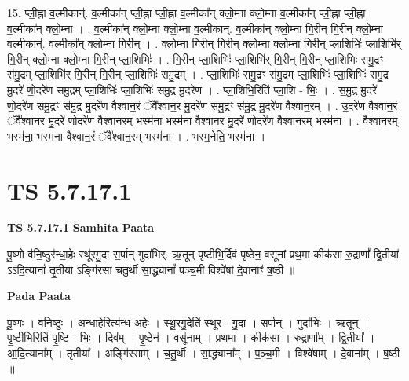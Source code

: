 \documentclass[17pt]{extarticle}
\begin{document}
15. प्ली॒ह्ना व॒ल्मीकान्॑. व॒ल्मीका᳚न् प्ली॒ह्ना प्ली॒ह्ना व॒ल्मीका᳚न् क्लो॒म्ना क्लो॒म्ना व॒ल्मीका᳚न् प्ली॒ह्ना प्ली॒ह्ना व॒ल्मीका᳚न् क्लो॒म्ना । . व॒ल्मीका᳚न् क्लो॒म्ना क्लो॒म्ना व॒ल्मीकान्॑. व॒ल्मीका᳚न् क्लो॒म्ना गि॒रीन् गि॒रीन् क्लो॒म्ना व॒ल्मीकान्॑. व॒ल्मीका᳚न् क्लो॒म्ना गि॒रीन् । . क्लो॒म्ना गि॒रीन् गि॒रीन् क्लो॒म्ना क्लो॒म्ना गि॒रीन् प्ला॒शिभिः॑ प्ला॒शिभि॑र् गि॒रीन् क्लो॒म्ना क्लो॒म्ना गि॒रीन् प्ला॒शिभिः॑ । . गि॒रीन् प्ला॒शिभिः॑ प्ला॒शिभि॑र् गि॒रीन् गि॒रीन् प्ला॒शिभिः॑ समु॒द्रꣳ स॑मु॒द्रम् प्ला॒शिभि॑र् गि॒रीन् गि॒रीन् प्ला॒शिभिः॑ समु॒द्रम् । . प्ला॒शिभिः॑ समु॒द्रꣳ स॑मु॒द्रम् प्ला॒शिभिः॑ प्ला॒शिभिः॑ समु॒द्र मु॒दरे॑ णो॒दरे॑ण समु॒द्रम् प्ला॒शिभिः॑ प्ला॒शिभिः॑ समु॒द्र मु॒दरे॑ण । . प्ला॒शिभि॒रिति॑ प्ला॒शि - भिः॒ । . स॒मु॒द्र मु॒दरे॑ णो॒दरे॑ण समु॒द्रꣳ स॑मु॒द्र मु॒दरे॑ण वैश्वान॒रं ॅवै᳚श्वान॒र मु॒दरे॑ण समु॒द्रꣳ स॑मु॒द्र मु॒दरे॑ण वैश्वान॒रम् । . उ॒दरे॑ण वैश्वान॒रं ॅवै᳚श्वान॒र मु॒दरे॑ णो॒दरे॑ण वैश्वान॒रम् भस्म॑ना॒ भस्म॑ना वैश्वान॒र मु॒दरे॑ णो॒दरे॑ण वैश्वान॒रम् भस्म॑ना । . वै॒श्वा॒न॒रम् भस्म॑ना॒ भस्म॑ना वैश्वान॒रं ॅवै᳚श्वान॒रम् भस्म॑ना । . भस्म॒नेति॒ भस्म॑ना । \newline
\pagebreak
{}

\section{ TS 5.7.17.1 }

\textbf{TS 5.7.17.1 } \newline
\textbf{Samhita Paata} \newline

पू॒ष्णो व॑नि॒ष्ठुर॑न्धा॒हेः स्थू॑रगु॒दा स॒र्पान् गुदा॑भिर्. ऋ॒तून् पृ॒ष्टीभि॒र्दिवं॑ पृ॒ष्ठेन॒ वसू॑नां प्रथ॒मा कीक॑सा रु॒द्राणां᳚ द्वि॒तीया॑ ऽऽदि॒त्यानां᳚ तृ॒तीया ऽङ्गि॑रसां चतु॒र्थी सा॒द्ध्यानां᳚ पञ्च॒मी विश्वे॑षां दे॒वानाꣳ॑ ष॒ष्ठी ॥ \newline

\textbf{Pada Paata} \newline

पू॒ष्णः । व॒नि॒ष्ठुः । अ॒न्धा॒हेरित्य॑न्ध-अ॒हेः । स्थू॒र॒गु॒देति॑ स्थूर - गु॒दा । स॒र्पान् । गुदा॑भिः । ऋ॒तून् । पृ॒ष्टीभि॒रिति॑ पृ॒ष्टि - भिः॒ । दिव᳚म् । पृ॒ष्ठेन॑ । वसू॑नाम् । प्र॒थ॒मा । कीक॑सा । रु॒द्राणा᳚म् । द्वि॒तीया᳚ । आ॒दि॒त्याना᳚म् । तृ॒तीया᳚ । अङ्गि॑रसाम् । च॒तु॒र्थी । सा॒द्ध्याना᳚म् । प॒ञ्च॒मी । विश्वे॑षाम् । दे॒वाना᳚म् । ष॒ष्ठी ॥  \newline
\end{document}
